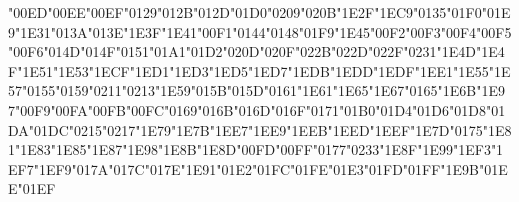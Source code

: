 {\char"00ED\gs \char"00EE\gs \char"00EF\gs \char"0129\gs \char"012B\gs \char"012D\gs \char"01D0\gs \char"0209\gs \char"020B\gs \char"1E2F\gs \char"1EC9\gs \char"0135\gs \char"01F0\gs \char"01E9\gs \char"1E31\gs \char"013A\gs \char"013E\gs \char"1E3F\gs \char"1E41\gs \char"00F1\gs \char"0144\gs \char"0148\gs \char"01F9\gs \char"1E45\gs \char"00F2\gs \char"00F3\gs \char"00F4\gs \char"00F5\gs \char"00F6\gs \char"014D\gs \char"014F\gs \char"0151\gs \char"01A1\gs \char"01D2\gs \char"020D\gs \char"020F\gs \char"022B\gs \char"022D\gs \char"022F\gs \char"0231\gs \char"1E4D\gs \char"1E4F\gs \char"1E51\gs \char"1E53\gs \char"1ECF\gs \char"1ED1\gs \char"1ED3\gs \char"1ED5\gs \char"1ED7\gs \char"1EDB\gs \char"1EDD\gs \char"1EDF\gs \char"1EE1\gs \char"1E55\gs \char"1E57\gs \char"0155\gs \char"0159\gs \char"0211\gs \char"0213\gs \char"1E59\gs \char"015B\gs \char"015D\gs \char"0161\gs \char"1E61\gs \char"1E65\gs \char"1E67\gs \char"0165\gs \char"1E6B\gs \char"1E97\gs \char"00F9\gs \char"00FA\gs \char"00FB\gs \char"00FC\gs \char"0169\gs \char"016B\gs \char"016D\gs \char"016F\gs \char"0171\gs \char"01B0\gs \char"01D4\gs \char"01D6\gs \char"01D8\gs \char"01DA\gs \char"01DC\gs \char"0215\gs \char"0217\gs \char"1E79\gs \char"1E7B\gs \char"1EE7\gs \char"1EE9\gs \char"1EEB\gs \char"1EED\gs \char"1EEF\gs \char"1E7D\gs \char"0175\gs \char"1E81\gs \char"1E83\gs \char"1E85\gs \char"1E87\gs \char"1E98\gs \char"1E8B\gs \char"1E8D\gs \char"00FD\gs \char"00FF\gs \char"0177\gs \char"0233\gs \char"1E8F\gs \char"1E99\gs \char"1EF3\gs \char"1EF7\gs \char"1EF9\gs \char"017A\gs \char"017C\gs \char"017E\gs \char"1E91\gs \char"01E2\gs \char"01FC\gs \char"01FE\gs \char"01E3\gs \char"01FD\gs \char"01FF\gs \char"1E9B\gs \char"01EE\gs \char"01EF\gs
}

